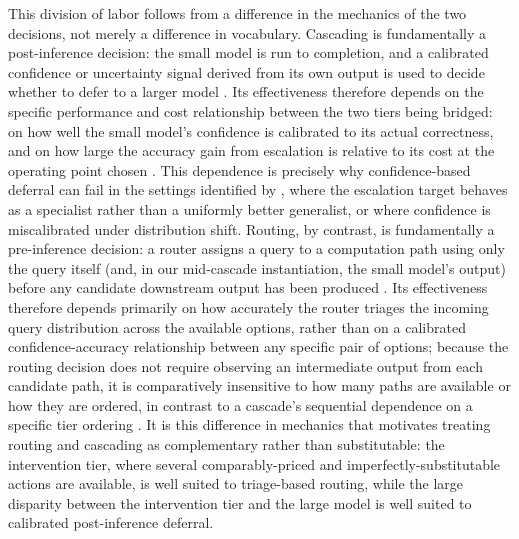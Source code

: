 \documentclass[sigconf]{acmart}
\begin{document}
This division of labor follows from a difference in the mechanics of the two decisions, not merely a difference in vocabulary. Cascading is fundamentally a post-inference decision: the small model is run to completion, and a calibrated confidence or uncertainty signal derived from its own output is used to decide whether to defer to a larger model \cite{varshney-baral-2022-model}. Its effectiveness therefore depends on the specific performance and cost relationship between the two tiers being bridged: on how well the small model's confidence is calibrated to its actual correctness, and on how large the accuracy gain from escalation is relative to its cost at the operating point chosen \cite{varshney-baral-2022-model, PLACEHOLDER:gupta-chow-cascades}. This dependence is precisely why confidence-based deferral can fail in the settings identified by \citet{jitkrittum2023when}, where the escalation target behaves as a specialist rather than a uniformly better generalist, or where confidence is miscalibrated under distribution shift. Routing, by contrast, is fundamentally a pre-inference decision: a router assigns a query to a computation path using only the query itself (and, in our mid-cascade instantiation, the small model's output) before any candidate downstream output has been produced \cite{chen2023frugalgptuselargelanguage, routerbench}. Its effectiveness therefore depends primarily on how accurately the router triages the incoming query distribution across the available options, rather than on a calibrated confidence-accuracy relationship between any specific pair of options; because the routing decision does not require observing an intermediate output from each candidate path, it is comparatively insensitive to how many paths are available or how they are ordered, in contrast to a cascade's sequential dependence on a specific tier ordering \cite{chen2023frugalgptuselargelanguage, routerbench}. It is this difference in mechanics that motivates treating routing and cascading as complementary rather than substitutable: the intervention tier, where several comparably-priced and imperfectly-substitutable actions are available, is well suited to triage-based routing, while the large disparity between the intervention tier and the large model is well suited to calibrated post-inference deferral.
 
\end{document}

